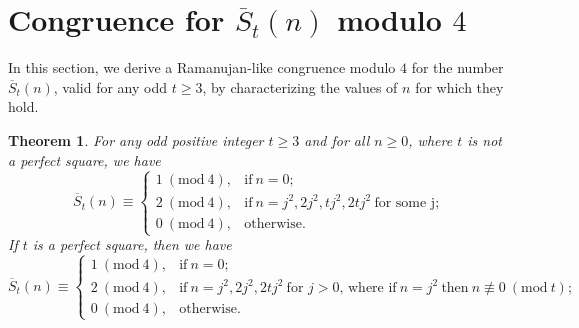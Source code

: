 \documentclass[12pt]{amsart}
\theoremstyle{plain}
\newtheorem{theorem}{Theorem}[section]
\theoremstyle{definition}
\begin{document}
\section{Congruence for $\overline{S}_{t}(n)$ modulo $4$} \label{sec1}
In this section, we derive a Ramanujan-like congruence modulo $4$ for the number $\overline{S}_{t}(n)$, valid for any odd $t\geq 3$, by characterizing the values of $n$ for which they hold.


\begin{theorem} For any odd positive integer $t\geq 3$ and for all $n \geq 0$, where $t$ is not a perfect square, we have
\[
 \overline{S}_{t}(n) \equiv
  \begin{cases}
    1 \ (\mathrm{mod} \ 4), & \text{if} \ n=0; \\
    2 \ (\mathrm{mod} \ 4), & \text{if} \ n=j^{2}, 2j^{2}, tj^{2}, 2tj^{2} \ \text{for some j}; \\
    0 \ (\mathrm{mod} \ 4), & \text{otherwise.}
  \end{cases}
\]
If $t$ is a perfect square, then we have
\[
 \overline{S}_{t}(n) \equiv
  \begin{cases}
    1 \ (\mathrm{mod} \ 4), & \text{if} \ n=0; \\
    2 \ (\mathrm{mod} \ 4), & \text{if} \ n=j^{2}, 2j^{2}, 2tj^{2} \ \text{for $j>0$, where if} \ n=j^2 \ \text{then} \ n\not\equiv 0  \ (\mathrm{mod} \ t); \\
    0 \ (\mathrm{mod} \ 4), & \text{otherwise.}
  \end{cases}
\]
\end{theorem}
\end{document}
